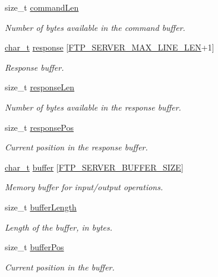 \begin{DoxyCompactItemize}
size\+\_\+t \hyperlink{struct__FtpClientConnection_a4cfc20dd03e715cc5caa6713735cb0e7}{command\+Len}
\begin{DoxyCompactList}\small\item\em Number of bytes available in the command buffer. \end{DoxyCompactList}\item 
\hyperlink{compiler__port_8h_a40bb5262bf908c328fbcfbe5d29d0201}{char\+\_\+t} \hyperlink{struct__FtpClientConnection_ab77cf9a459475c16caa0d4204d7c6ca0}{response} \mbox{[}\hyperlink{ftp__server_8h_a311e12601252dc2319ee256bb6e714ba}{F\+T\+P\+\_\+\+S\+E\+R\+V\+E\+R\+\_\+\+M\+A\+X\+\_\+\+L\+I\+N\+E\+\_\+\+L\+EN}+1\mbox{]}
\begin{DoxyCompactList}\small\item\em Response buffer. \end{DoxyCompactList}\item 
size\+\_\+t \hyperlink{struct__FtpClientConnection_acf313cf05ba0f5ac28a472e312457be2}{response\+Len}
\begin{DoxyCompactList}\small\item\em Number of bytes available in the response buffer. \end{DoxyCompactList}\item 
size\+\_\+t \hyperlink{struct__FtpClientConnection_ab3bfa0b68d6d1e8e66f34abb71d0771e}{response\+Pos}
\begin{DoxyCompactList}\small\item\em Current position in the response buffer. \end{DoxyCompactList}\item 
\hyperlink{compiler__port_8h_a40bb5262bf908c328fbcfbe5d29d0201}{char\+\_\+t} \hyperlink{struct__FtpClientConnection_ab44673cccab94f0632ae554a0989a94d}{buffer} \mbox{[}\hyperlink{ftp__server_8h_a37067cf14f1730ca29fec31f4c8a2bff}{F\+T\+P\+\_\+\+S\+E\+R\+V\+E\+R\+\_\+\+B\+U\+F\+F\+E\+R\+\_\+\+S\+I\+ZE}\mbox{]}
\begin{DoxyCompactList}\small\item\em Memory buffer for input/output operations. \end{DoxyCompactList}\item 
size\+\_\+t \hyperlink{struct__FtpClientConnection_ae6308df790baf35244826e38761696b5}{buffer\+Length}
\begin{DoxyCompactList}\small\item\em Length of the buffer, in bytes. \end{DoxyCompactList}\item 
size\+\_\+t \hyperlink{struct__FtpClientConnection_af64f5a6528971bc633bc8da8706c60e6}{buffer\+Pos}
\begin{DoxyCompactList}\small\item\em Current position in the buffer. \end{DoxyCompactList}\end{DoxyCompactItemize}



